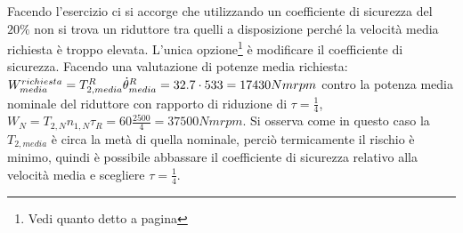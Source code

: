 Facendo l'esercizio ci si accorge che utilizzando un coefficiente di sicurezza del $20\%$ non si trova un riduttore tra quelli a disposizione perché la velocità media richiesta è troppo elevata. L'unica opzione\footnote{Vedi quanto detto a pagina \pageref{rivalutazione_coeff_sic}} è modificare il coefficiente di sicurezza.
Facendo una valutazione di potenze media richiesta: \(W_{media}^{richiesta}=T_{2,media}^R \dot{\theta}^R_{media}=32.7\cdot 533 = 17430 Nmrpm\) contro la potenza media nominale del riduttore con rapporto di riduzione di \(\tau=\frac{1}{4}\), \(W_{N} = T_{2,N} n_{1,N}\tau_R = 60 \frac{2500}{4} = 37500 Nm rpm\).
Si osserva come in questo caso la $T_{2,media}$ è circa la metà di quella nominale, perciò termicamente il rischio è minimo, quindi è possibile abbassare il coefficiente di sicurezza relativo alla velocità media e scegliere \(\tau = \frac{1}{4}\).